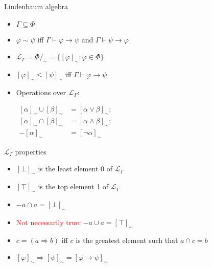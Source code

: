 \documentclass[sans]{beamer}
\begin{document}
\newcommand{\eqc}[1]{[#1]_{\sim}}
\newcommand{\mlg}{\mathcal{L}_{\Gamma}\;}
\newcommand{\mlgm}{$\mlg$}

\begin{frame}{Lindenbaum algebra}
  \begin{itemize}
    \item $\Gamma \subseteq \Phi$
    \item $\varphi \sim \psi$ iff $\Gamma \vdash \varphi \to \psi$ and $\Gamma \vdash \psi \to \varphi$
    \item $\mathcal{L} _{\Gamma} = {\Phi}/_{\sim} = \{\eqc{\varphi} : \varphi \in \Phi\}$
    \item $\eqc{\varphi} \leq \eqc{\psi}$ iff $\Gamma \vdash \varphi \to \psi$
    \item Operations over $\mathcal{L}_{\Gamma}$:

      $\begin{aligned}
        \eqc{\alpha} \cup \eqc{\beta} &= \eqc{\alpha \vee \beta}; \\
        \eqc{\alpha} \cap \eqc{\beta} &= \eqc{\alpha \wedge \beta}; \\
                     -\eqc{\alpha} &= \eqc{\lnot \alpha}
       \end{aligned}$
  \end{itemize}
\end{frame}

\begin{frame}{\mlgm properties}
  \begin{itemize}
    \item $\eqc{\bot}$ is the least element 0 of \mlgm
    \item $\eqc{\top}$ is the top element 1 of \mlgm
    
    \vfill
    \item $-a \cap a = \eqc{\bot}$
    \item \textcolor{red}{Not necessarily true:} $-a \cup a = \eqc{\top}$
    \vfill

    \item $c = (a \Rightarrow b)$ iff $c$ is the greatest element such that $a \cap c = b$
    \item $\eqc{\varphi} \Rightarrow \eqc{\psi} = \eqc{\varphi \to \psi}$

  \end{itemize}
\end{frame}
\end{document}

